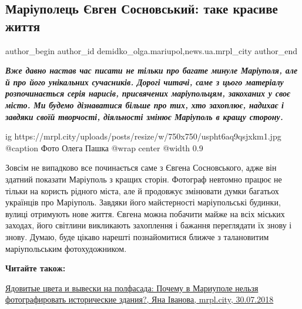  
 
 
 
 
 
\subsection{Маріуполець Євген Сосновський: таке красиве життя}
\label{sec:19_01_2019.stz.news.ua.mrpl_city.1.sosnovsky_take_krasyve_zhyttja}
 
\ifcmt
 author_begin
   author_id demidko_olga.mariupol,news.ua.mrpl_city
 author_end
\fi

\begin{center}
\color{blue}\em
\textbf{Вже давно настав час писати не тільки про багате минуле Маріуполя, але й про
його унікальних сучасників. Дорогі читачі, саме з цього матеріалу
розпочинається серія нарисів, присвячених маріупольцям, закоханих у своє місто.
Ми будемо дізнаватися більше про тих, хто захоплює, надихає і завдяки своїй
творчості, діяльності змінює Маріуполь в кращу сторону.}
\end{center}

\ifcmt
  ig https://mrpl.city/uploads/posts/resize/w/750x750/uspht6aq9qsjxkm1.jpg
	@caption Фото Олега Пашка
  @wrap center
  @width 0.9
\fi

Зовсім не випадково все починається саме з Євгена Сосновського, адже він
здатний показати Маріуполь з кращих сторін. Фотограф невтомно працює не тільки
на користь рідного міста, але й продовжує змінювати думки багатьох українців
про Маріуполь. Завдяки його майстерності маріупольські будинки, вулиці
отримують нове життя. Євгена можна побачити майже на всіх міських заходах, його
світлини викликають захоплення і бажання переглядати їх знову і знову. Думаю,
буде цікаво нарешті познайомитися ближче з талановитим маріупольським
фотохудожником.

\textbf{Читайте також:} 

\href{https://mrpl.city/news/view/yadovitye-tsveta-i-vyveski-na-polfasada-pochemu-v-mariupole-nelzya-fotografirovat-istoricheskie-zdaniya-foto}{%
Ядовитые цвета и вывески на полфасада: Почему в Мариуполе нельзя фотографировать исторические здания?, %
Яна Іванова, mrpl.city, 30.07.2018%
}

